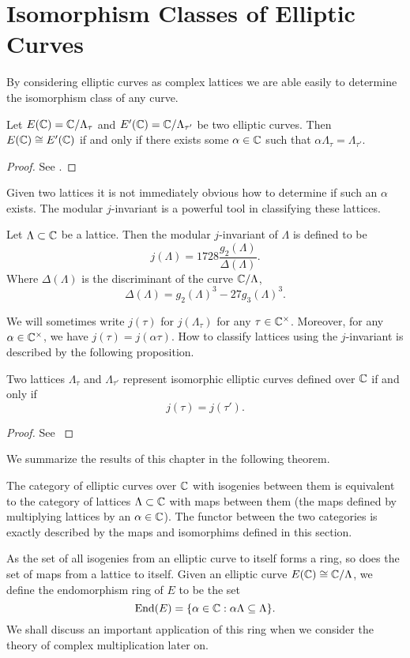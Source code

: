 \section{Isomorphism Classes of Elliptic Curves}
By considering elliptic curves as complex lattices we are able easily to determine the isomorphism class of any curve. 
\begin{prop}
Let $E(\mathbb{C}) = \mathbb{C}/\Lambda_\tau$ and $E'(\mathbb{C}) = \mathbb{C}/\Lambda_{\tau'}$ be two elliptic curves. Then $E(\mathbb{C})\cong E'(\mathbb{C})$ if and only if there exists some $\alpha \in \mathbb{C}$ such that $\alpha\Lambda_\tau = \Lambda_{\tau'}$.
\end{prop}
\begin{proof}
See \cite[Page 171]{Silverman}.
\end{proof}
Given two lattices it is not immediately obvious how to determine if such an $\alpha$ exists. The modular $j$-invariant is a powerful tool in classifying these lattices. 

\begin{definition}
Let $\Lambda \subset \mathbb{C}$ be a lattice. Then the modular $j$-invariant of $\Lambda$ is defined to be
$$j(\Lambda) = 1728 \frac{g_2(\Lambda)}{\Delta(\Lambda)}.$$
Where $\Delta(\Lambda)$ is the discriminant of the curve $\mathbb{C}/\Lambda$,
$$\Delta(\Lambda) = g_2(\Lambda)^3 - 27g_3(\Lambda)^3.$$
\end{definition}
We will sometimes write $j(\tau)$ for $j(\Lambda_\tau)$ for any $\tau \in \mathbb{C}^\times$. Moreover, for any $\alpha \in \mathbb{C}^\times$, we have $j(\tau) = j(\alpha\tau).$ How to classify lattices using the $j$-invariant is described by the following proposition.
\begin{prop}
Two lattices $\Lambda_\tau$ and $\Lambda_{\tau'}$ represent isomorphic elliptic curves defined over $\mathbb{C}$ if and only if
$$j(\tau) = j(\tau').$$
\end{prop}
\begin{proof}
See \cite[Page 36]{Silverman1} 
\end{proof}

We summarize the results of this chapter in the following theorem. 
\begin{thm}
The category of elliptic curves over $\mathbb{C}$ with isogenies between them is equivalent to the category of lattices $\Lambda \subset \mathbb{C}$ with maps between them (the maps defined by multiplying lattices by an $\alpha \in \mathbb{C}$). The functor between the two categories is exactly described by the maps and isomorphims defined in this section.
\end{thm}
As the set of all isogenies from an elliptic curve to itself forms a ring, so does the set of maps from a lattice to itself. Given an elliptic curve $E(\mathbb{C}) \cong \mathbb{C}/\Lambda$, we define the endomorphism ring of $E$ to be the set
$$\text{End}(E) = \{\alpha \in \mathbb{C} : \alpha\Lambda \subseteq \Lambda \}.$$
We shall discuss an important application of this ring when we consider the theory of complex multiplication later on.